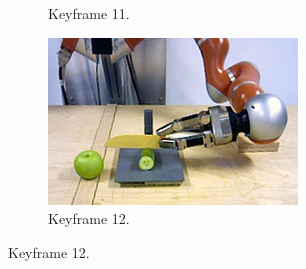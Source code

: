 \begin{figure}
\begin{subfigure}[t]{0.475\textwidth}
    \caption{Keyframe 11.}
    \label{fig:sec_usingaffordanceforplanning_results_scenario4_11}
  \end{subfigure}
  \hfill
  \begin{subfigure}[t]{0.475\textwidth}
    \includegraphics[width=\textwidth]{./figures/sec/planning/exec4/frame4450.jpg}
    \caption{Keyframe 12.}
    \label{fig:sec_usingaffordanceforplanning_results_scenario4_12}
  \end{subfigure}
\end{figure}
